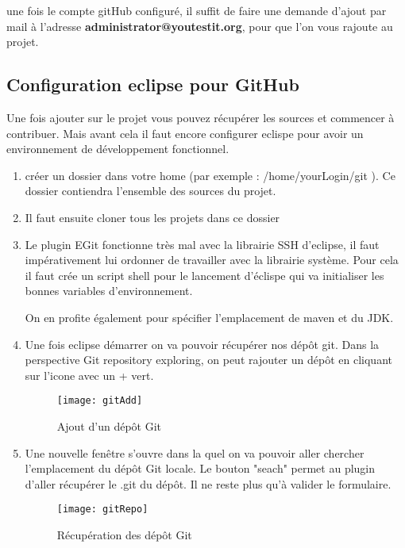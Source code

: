une fois le compte gitHub configuré, il suffit de faire une demande d'ajout par mail à l'adresse
\textbf{administrator@youtestit.org}, pour que l'on vous rajoute au projet.

\subsection{Configuration eclipse pour GitHub}
Une fois ajouter sur le projet  vous pouvez récupérer les sources et commencer à contribuer. 
Mais avant cela il faut encore configurer eclispe pour avoir un environnement de développement
fonctionnel. 

\begin{enumerate}
	\item créer un dossier dans votre home (par exemple : /home/yourLogin/git ). Ce dossier contiendra
	 l'ensemble des sources du projet.
	 
	\item Il faut ensuite cloner tous les projets dans ce dossier
	 
	 
	 \item Le plugin EGit fonctionne très mal avec la librairie SSH d'eclipse, il faut impérativement lui
	 ordonner de travailler avec la librairie système. Pour cela il faut  crée un script shell pour le lancement
	 d'éclispe qui va initialiser les bonnes variables d'environnement.
	 
	 
	On en profite également pour spécifier l'emplacement de maven et du JDK.
	\newpage

	 \item Une fois eclipse démarrer on va pouvoir récupérer nos dépôt git. Dans la perspective
	 Git repository exploring, on peut rajouter un dépôt en cliquant sur l'icone avec un + vert.
		\begin{figure}[!h]
     		\begin{center}
			      \texttt{[image: gitAdd]}
			      \caption{Ajout d'un dépôt Git}
			      \label{gitAdd}
		    \end{center}
		\end{figure}
		
	 \item Une nouvelle fenêtre s'ouvre dans la quel on va pouvoir aller chercher  l'emplacement du
	 dépôt Git locale. Le bouton "seach" permet au plugin d'aller récupérer le .git du dépôt. Il ne 
	 reste plus qu'à valider le formulaire.
		\begin{figure}[!h]
     		\begin{center}
			      \texttt{[image: gitRepo]}
			      \caption{Récupération des dépôt Git}
			      \label{gitAddRepo}
		    \end{center}
		\end{figure}
		\newpage
	 

\end{enumerate}
